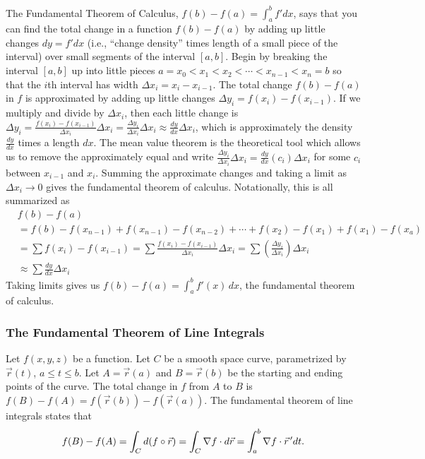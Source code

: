 The Fundamental Theorem of Calculus, $f(b)-f(a)=\int_a^b f' dx$, says
that you can find the total change in a function $f(b)-f(a)$ by adding
up little changes $dy=f'dx$ (i.e., ``change density'' times length of
a small piece of the interval) over small segments of the interval
$[a,b]$.  Begin by breaking the interval {$[a,b]$} up into little
pieces {$a=x_0<x_1<x_2<\cdots <x_{n-1}<x_n=b $} so that the $i$th interval
has width $\Delta x_i = x_i-x_{i-1}$. The total change {$f(b)-f(a)$} in $f$
is approximated by adding up little changes $\Delta
y_i=f(x_i)-f(x_{i-1})$. If we multiply and divide by $\Delta x_i$, then
each little change is $\Delta y_i=\frac{f(x_i)-f(x_{i-1})}{\Delta x_i}\Delta x_i =
\frac{\Delta y_i}{\Delta x_i}\Delta x_i \approx \frac{dy}{dx}\Delta x_i$, which is approximately
the density $\frac{dy}{dx}$ times a length $dx$. The mean value
theorem is the theoretical tool which allows us to remove the
approximately equal and write $\frac{\Delta y_i}{\Delta x_i}\Delta x_i =
\frac{dy}{dx}(c_i)\Delta x_i$ for some $c_i$ between $x_{i-1}$ and $x_i$.
Summing the approximate changes and taking a limit as $\Delta x_i\to 0$ gives
the fundamental theorem of calculus. Notationally, this is all
summarized as
\begin{align*}
&f(b)-f(a) \\
&= f(b)-f(x_{n-1}) + f(x_{n-1})-f(x_{n-2})+\cdots + f(x_{2})-f(x_{1})+
f(x_{1})-f(x_{a}) \\
&= \sum f(x_i) - f(x_{i-1}) 
= \sum\frac{f(x_i) - f(x_{i-1})}{ \Delta x_i}\Delta x_i 
= \sum\left(\frac{\Delta y_i}{ \Delta x_i}\right)\Delta x_i  \\
&\approx \sum\frac{dy}{ dx}\Delta x_i 
\end{align*}
Taking limits gives us {$ f(b)-f(a) = \int_a^b f'(x)\,dx $}, the
fundamental theorem of calculus. 

\subsubsection{The Fundamental Theorem of Line Integrals}
Let {$ f(x,y,z) $} be a function. Let $C$ be a smooth space curve,
parametrized by {$ \vec r(t)$, $a\leq t\leq b $}. Let {$ A=\vec r(a) $} and {$
B=\vec r(b) $} be the starting and ending points of the curve. The total
change in {$ f $} from {$ A $} to {$ B $} is $f(B)-f(A) = f(\vec
r(b))-f(\vec r(a))$.  The fundamental theorem of line integrals states
that 
$$ f(B)-f(A) = \int_C d(f\circ \vec r) = \int_C \nabla f\cdot d\vec r = \int_a^b \nabla f \cdot \vec
r^{\,\prime} dt. $$ 

